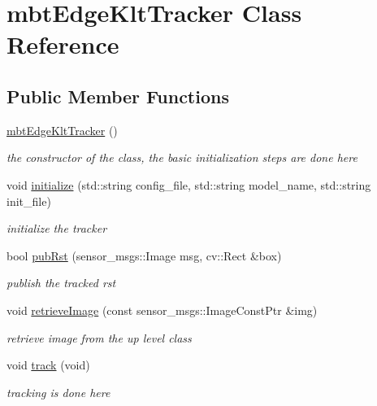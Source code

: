 \hypertarget{classmbtEdgeKltTracker}{\section{mbt\-Edge\-Klt\-Tracker \-Class \-Reference}
\label{classmbtEdgeKltTracker}
}
\subsection*{\-Public \-Member \-Functions}
\begin{DoxyCompactItemize}
\item 
\hypertarget{classmbtEdgeKltTracker_ab26b9dd74f2dd65f194f219313413f22}{\hyperlink{classmbtEdgeKltTracker_ab26b9dd74f2dd65f194f219313413f22}{mbt\-Edge\-Klt\-Tracker} ()}\label{classmbtEdgeKltTracker_ab26b9dd74f2dd65f194f219313413f22}

\begin{DoxyCompactList}\small\item\em the constructor of the class, the basic initialization steps are done here \end{DoxyCompactList}\item 
\hypertarget{classmbtEdgeKltTracker_a3963a97622eb1b5c7b7c9b8293f419a8}{void \hyperlink{classmbtEdgeKltTracker_a3963a97622eb1b5c7b7c9b8293f419a8}{initialize} (std\-::string config\-\_\-file, std\-::string model\-\_\-name, std\-::string init\-\_\-file)}\label{classmbtEdgeKltTracker_a3963a97622eb1b5c7b7c9b8293f419a8}

\begin{DoxyCompactList}\small\item\em initialize the tracker \end{DoxyCompactList}\item 
bool \hyperlink{classmbtEdgeKltTracker_aa5f41d0aecdec85610e24a5e70db0c31}{pub\-Rst} (sensor\-\_\-msgs\-::\-Image msg, cv\-::\-Rect \&box)
\begin{DoxyCompactList}\small\item\em publish the tracked rst \end{DoxyCompactList}\item 
void \hyperlink{classmbtEdgeKltTracker_a4fe86cb923e54cbe4f3b5b6a313ac888}{retrieve\-Image} (const sensor\-\_\-msgs\-::\-Image\-Const\-Ptr \&img)
\begin{DoxyCompactList}\small\item\em retrieve image from the up level class \end{DoxyCompactList}\item 
\hypertarget{classmbtEdgeKltTracker_a91bf02e888da5da55fe5c8ed83550a1a}{void \hyperlink{classmbtEdgeKltTracker_a91bf02e888da5da55fe5c8ed83550a1a}{track} (void)}\label{classmbtEdgeKltTracker_a91bf02e888da5da55fe5c8ed83550a1a}

\begin{DoxyCompactList}\small\item\em tracking is done here \end{DoxyCompactList}\end{DoxyCompactItemize}



